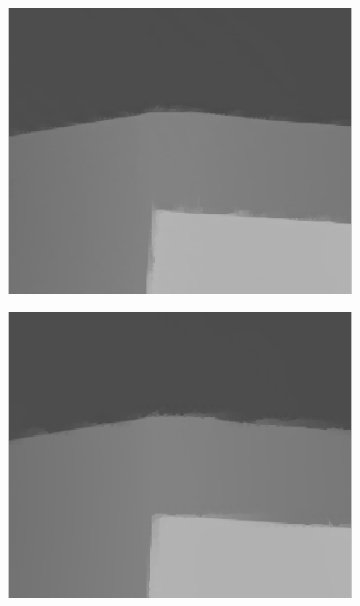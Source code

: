 \documentclass[preprint,10pt,5p,times,twocolumn]{elsarticle}
\begin{document}
\begin{figure}[t]
\begin{center}
\begin{subfigure}[b]{0.136\linewidth}
    \includegraphics[width=\linewidth]{cmp_book_8X_ST_part.png}
    \label{fig:}
\end{subfigure}
\begin{subfigure}[b]{0.136\linewidth}
    \includegraphics[width=\linewidth]{cmp_book_8X_LF_part.png}
    \label{fig:} %
\end{subfigure}
\begin{subfigure}[b]{0.136\linewidth}

\end{subfigure}
\end{center}
\end{figure}
\end{document}
